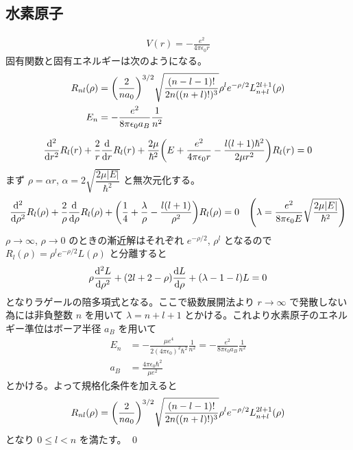 \documentclass[uplatex,dvipdfmx,a4paper,11pt]{jlreq}
\makeatletter
\theoremstyle{definition}
\renewenvironment{proof}[1][\proofname]{\par
  \normalfont
  \topsep6\p@\@plus6\p@ \trivlist
  \item[\hskip\labelsep{\bfseries #1}\@addpunct{\bfseries}]\ignorespaces\quad\par
}{%
  \qed\endtrivlist\@endpefalse
}
\renewcommand\proofname{証明}
\makeatother
\begin{document}
\subsection{水素原子}
\begin{proposition}
  \begin{align}
    V(r) = -\frac{e^2}{4\pi\epsilon_0r}
  \end{align}
  固有関数と固有エネルギーは次のようになる。
  \begin{align}
    R_{nl}(\rho) & = \qty(\frac{2}{na_0})^{3/2}\sqrt{\frac{(n-l-1)!}{2n((n+l)!)^3}}\rho^le^{-\rho/2}L_{n+l}^{2l+1}(\rho) \\
    E_n          & = - \frac{e^2}{8\pi\epsilon_0a_B}\frac{1}{n^2}
  \end{align}
\end{proposition}
\begin{proof}
  \begin{align}
    \dv[2]{r}R_l(r) + \frac{2}{r}\dv{r}R_l(r) + \frac{2\mu}{\hbar^2}\qty(E + \frac{e^2}{4\pi\epsilon_0r} - \frac{l(l+1)\hbar^2}{2\mu r^2})R_l(r) = 0
  \end{align}
  まず $\rho = \alpha r$, $\alpha = 2\sqrt{\dfrac{2\mu|E|}{\hbar^2}}$ と無次元化する。
  \begin{align}
    \dv[2]{\rho}R_l(\rho) + \frac{2}{\rho}\dv{\rho}R_l(\rho) + \qty(\frac{1}{4} + \frac{\lambda}{\rho} - \frac{l(l+1)}{\rho^2})R_l(\rho) & = 0 & \qty(\lambda = \frac{e^2}{8\pi\epsilon_0E}\sqrt{\dfrac{2\mu|E|}{\hbar^2}})
  \end{align}
  $\rho\to\infty$, $\rho\to 0$ のときの漸近解はそれぞれ $e^{-\rho/2}$, $\rho^l$ となるので $R_l(\rho) = \rho^le^{-\rho/2}L(\rho)$ と分離すると
  \begin{align}
    \rho\dv[2]{L}{\rho} + (2l + 2 - \rho)\dv{L}{\rho} + (\lambda - 1 - l)L = 0
  \end{align}
  となりラゲールの陪多項式となる。ここで級数展開法より $r\to\infty$ で発散しない為には非負整数 $n$ を用いて $\lambda = n + l + 1$ とかける。これより水素原子のエネルギー準位はボーア半径 $a_B$ を用いて
  \begin{align}
    E_n & = - \frac{\mu e^4}{2(4\pi\epsilon_0)^2\hbar^2}\frac{1}{n^2} =  - \frac{e^2}{8\pi\epsilon_0a_B}\frac{1}{n^2} \\
    a_B & = \frac{4\pi\epsilon_0\hbar^2}{\mu e^2}
  \end{align}
  とかける。よって規格化条件を加えると
  \begin{align}
    R_{nl}(\rho) = \qty(\frac{2}{na_0})^{3/2}\sqrt{\frac{(n-l-1)!}{2n((n+l)!)^3}}\rho^le^{-\rho/2}L_{n+l}^{2l+1}(\rho)
  \end{align}
  となり $0\leq l < n$ を満たす。
\end{proof}
\end{document}
